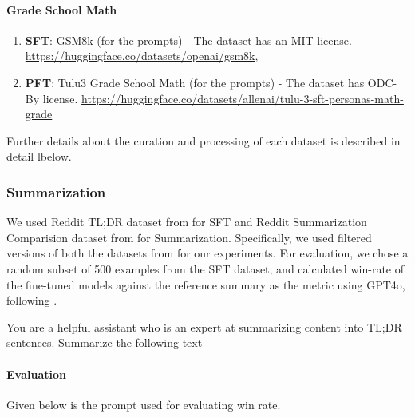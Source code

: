 \paragraph{Grade School Math}
\begin{enumerate}
    \item \textbf{SFT}: GSM8k (for the prompts) - The dataset has an MIT license. \href{https://huggingface.co/datasets/openai/gsm8k}{https://huggingface.co/datasets/openai/gsm8k}, 
    \item \textbf{PFT}: Tulu3 Grade School Math (for the prompts) - The dataset has ODC-By license. \href{https://huggingface.co/datasets/allenai/tulu-3-sft-personas-math-grade}{https://huggingface.co/datasets/allenai/tulu-3-sft-personas-math-grade}

\end{enumerate}

Further details about the curation and processing of each dataset is described in detail lbelow. 

\subsubsection{Summarization}

We used Reddit TL;DR dataset from \citet{volske-etal-2017-tl} for SFT and Reddit Summarization Comparision dataset from \citet{stienon2020learning} for Summarization. Specifically, we used filtered versions of both the datasets from \citet{kirk2024understandingeffectsrlhfllm} for our experiments. For evaluation, we chose a random subset of 500 examples from the SFT dataset, and calculated win-rate of the fine-tuned models against the reference summary as the metric using GPT4o, following \citet{rafailov2024direct}. 

\begin{tcolorbox}[breakable, title=System message]
    You are a helpful assistant who is an expert at summarizing content into TL;DR sentences. Summarize the following text
\end{tcolorbox}

\paragraph{Evaluation} Given below is the prompt used for evaluating win rate. 

